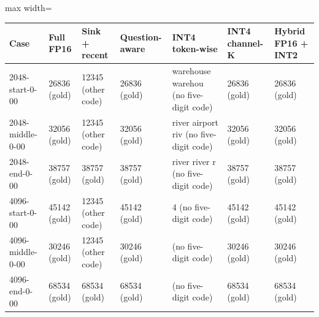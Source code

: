 \scriptsize
\setlength{\tabcolsep}{3.5pt}
\label{tab:t2canswers}
\begin{adjustbox}{max width=\linewidth}
\begin{tabular}{lp{1.5cm}p{1.6cm}p{1.6cm}p{2.3cm}p{1.6cm}p{1.6cm}}
\toprule
Case & Full FP16 & Sink + recent & Question-aware & INT4 token-wise & INT4 channel-K & Hybrid FP16 + INT2 \\
\midrule
2048-start-0-00 & 26836 (gold) & 12345 (other code) & 26836 (gold) & warehouse warehou (no five-digit code) & 26836 (gold) & 26836 (gold) \\
2048-middle-0-00 & 32056 (gold) & 12345 (other code) & 32056 (gold) & river airport riv (no five-digit code) & 32056 (gold) & 32056 (gold) \\
2048-end-0-00 & 38757 (gold) & 38757 (gold) & 38757 (gold) & river  river  r (no five-digit code) & 38757 (gold) & 38757 (gold) \\
4096-start-0-00 & 45142 (gold) & 12345 (other code) & 45142 (gold) & 4 (no five-digit code) & 45142 (gold) & 45142 (gold) \\
4096-middle-0-00 & 30246 (gold) & 12345 (other code) & 30246 (gold) & (no five-digit code) & 30246 (gold) & 30246 (gold) \\
4096-end-0-00 & 68534 (gold) & 68534 (gold) & 68534 (gold) & (no five-digit code) & 68534 (gold) & 68534 (gold) \\
\bottomrule
\end{tabular}
\end{adjustbox}
